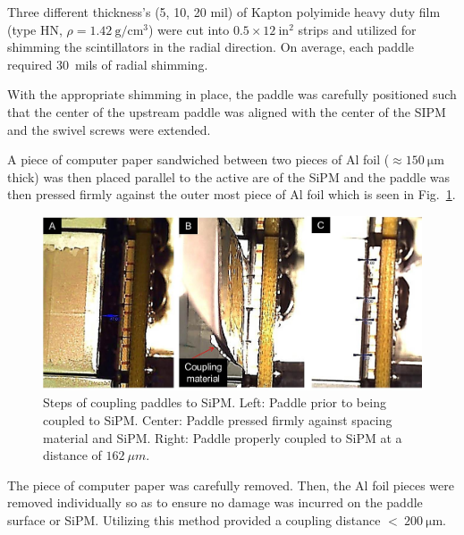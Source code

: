 Three different thickness's (5, 10, 20 mil) of Kapton polyimide heavy duty film (type HN, $\rho = 1.42\ \mathrm{g/cm^{3}}$) were cut into $\mathrm{0.5 \times 12\ in^{2}}$ strips and utilized for shimming the scintillators in the radial direction.  On average, each paddle required 30~mils of radial shimming.

With the appropriate shimming in place, the paddle was carefully positioned such that the center of the upstream paddle was aligned with the center of the SIPM and the swivel screws were extended.  

A piece of computer paper sandwiched between two pieces of Al foil ($\approx 150\ \mathrm{\mu m}$ thick) was then placed parallel to the active are of the SiPM and the paddle was then pressed firmly against the outer most piece of Al foil which is seen in Fig.~\ref{fig:sipm_coupling}.
\begin{figure}[!htb]
	\centering
	\includegraphics[width=1.0\columnwidth]{fabrication/figs/st_coupling}
	\caption{Steps of coupling paddles to SiPM.  Left: Paddle prior to being coupled to SiPM.  Center:  Paddle pressed firmly against spacing material and SiPM.  Right: Paddle properly coupled to SiPM at a distance of $162\ \mu m$.}
	\label{fig:sipm_coupling}
\end{figure}
The piece of computer paper was carefully removed. Then, the Al foil pieces were removed individually so as to ensure no damage was incurred on the paddle surface or SiPM.  Utilizing this method provided a coupling distance $\mathrm{<\ 200\ \mu m}$.

